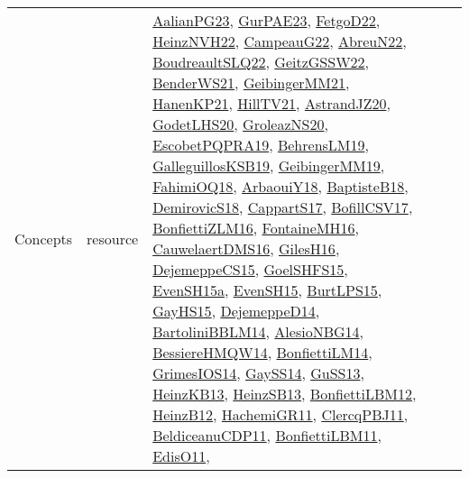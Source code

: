 {\begin{longtable}{lp{3cm}>{\raggedright}p{6cm}>{\raggedright}p{6cm}p{8cm}}
Concepts & resource & \href{papers/AalianPG23.pdf}{AalianPG23}\cite{AalianPG23}, \href{articles/GurPAE23.pdf}{GurPAE23}\cite{GurPAE23}, \href{articles/FetgoD22.pdf}{FetgoD22}\cite{FetgoD22}, \href{articles/HeinzNVH22.pdf}{HeinzNVH22}\cite{HeinzNVH22}, \href{articles/CampeauG22.pdf}{CampeauG22}\cite{CampeauG22}, \href{articles/AbreuN22.pdf}{AbreuN22}\cite{AbreuN22}, \href{papers/BoudreaultSLQ22.pdf}{BoudreaultSLQ22}\cite{BoudreaultSLQ22}, \href{papers/GeitzGSSW22.pdf}{GeitzGSSW22}\cite{GeitzGSSW22}, \href{papers/BenderWS21.pdf}{BenderWS21}\cite{BenderWS21}, \href{papers/GeibingerMM21.pdf}{GeibingerMM21}\cite{GeibingerMM21}, \href{papers/HanenKP21.pdf}{HanenKP21}\cite{HanenKP21}, \href{papers/HillTV21.pdf}{HillTV21}\cite{HillTV21}, \href{articles/AstrandJZ20.pdf}{AstrandJZ20}\cite{AstrandJZ20}, \href{papers/GodetLHS20.pdf}{GodetLHS20}\cite{GodetLHS20}, \href{papers/GroleazNS20.pdf}{GroleazNS20}\cite{GroleazNS20}, \href{articles/EscobetPQPRA19.pdf}{EscobetPQPRA19}\cite{EscobetPQPRA19}, \href{papers/BehrensLM19.pdf}{BehrensLM19}\cite{BehrensLM19}, \href{papers/GalleguillosKSB19.pdf}{GalleguillosKSB19}\cite{GalleguillosKSB19}, \href{papers/GeibingerMM19.pdf}{GeibingerMM19}\cite{GeibingerMM19}, \href{articles/FahimiOQ18.pdf}{FahimiOQ18}\cite{FahimiOQ18}, \href{papers/ArbaouiY18.pdf}{ArbaouiY18}\cite{ArbaouiY18}, \href{articles/BaptisteB18.pdf}{BaptisteB18}\cite{BaptisteB18}, \href{papers/DemirovicS18.pdf}{DemirovicS18}\cite{DemirovicS18}, \href{papers/CappartS17.pdf}{CappartS17}\cite{CappartS17}, \href{papers/BofillCSV17.pdf}{BofillCSV17}\cite{BofillCSV17}, \href{papers/BonfiettiZLM16.pdf}{BonfiettiZLM16}\cite{BonfiettiZLM16}, \href{papers/FontaineMH16.pdf}{FontaineMH16}\cite{FontaineMH16}, \href{papers/CauwelaertDMS16.pdf}{CauwelaertDMS16}\cite{CauwelaertDMS16}, \href{papers/GilesH16.pdf}{GilesH16}\cite{GilesH16}, \href{papers/DejemeppeCS15.pdf}{DejemeppeCS15}\cite{DejemeppeCS15}, \href{articles/GoelSHFS15.pdf}{GoelSHFS15}\cite{GoelSHFS15}, \href{articles/EvenSH15a.pdf}{EvenSH15a}\cite{EvenSH15a}, \href{papers/EvenSH15.pdf}{EvenSH15}\cite{EvenSH15}, \href{papers/BurtLPS15.pdf}{BurtLPS15}\cite{BurtLPS15}, \href{papers/GayHS15.pdf}{GayHS15}\cite{GayHS15}, \href{papers/DejemeppeD14.pdf}{DejemeppeD14}\cite{DejemeppeD14}, \href{papers/BartoliniBBLM14.pdf}{BartoliniBBLM14}\cite{BartoliniBBLM14}, \href{papers/AlesioNBG14.pdf}{AlesioNBG14}\cite{AlesioNBG14}, \href{papers/BessiereHMQW14.pdf}{BessiereHMQW14}\cite{BessiereHMQW14}, \href{papers/BonfiettiLM14.pdf}{BonfiettiLM14}\cite{BonfiettiLM14}, \href{articles/GrimesIOS14.pdf}{GrimesIOS14}\cite{GrimesIOS14}, \href{papers/GaySS14.pdf}{GaySS14}\cite{GaySS14}, \href{papers/GuSS13.pdf}{GuSS13}\cite{GuSS13}, \href{papers/HeinzKB13.pdf}{HeinzKB13}\cite{HeinzKB13}, \href{articles/HeinzSB13.pdf}{HeinzSB13}\cite{HeinzSB13}, \href{papers/BonfiettiLBM12.pdf}{BonfiettiLBM12}\cite{BonfiettiLBM12}, \href{papers/HeinzB12.pdf}{HeinzB12}\cite{HeinzB12}, \href{articles/HachemiGR11.pdf}{HachemiGR11}\cite{HachemiGR11}, \href{papers/ClercqPBJ11.pdf}{ClercqPBJ11}\cite{ClercqPBJ11}, \href{articles/BeldiceanuCDP11.pdf}{BeldiceanuCDP11}\cite{BeldiceanuCDP11}, \href{papers/BonfiettiLBM11.pdf}{BonfiettiLBM11}\cite{BonfiettiLBM11}, \href{papers/EdisO11.pdf}{EdisO11}\cite{EdisO11}, 
\end{longtable}}
